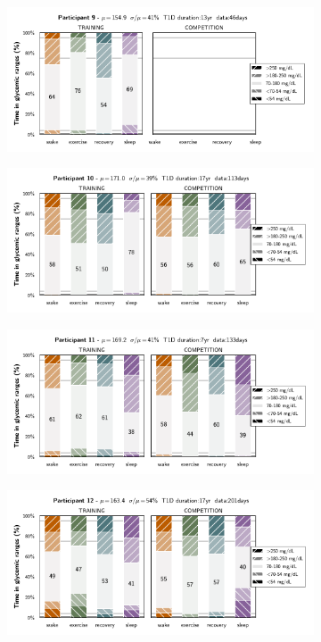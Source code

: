 \documentclass[11pt,a4paper]{article}
\begin{document}
\begin{figure}\ContinuedFloat
    \centering
    \begin{subfigure}{\textwidth}
        \centering
        \includegraphics[width=.75\textwidth]{figure/time_in_zone/time_in_glucoselevel_traincomp_9.pdf}
    \end{subfigure}\vfill
    \begin{subfigure}{\textwidth}
        \centering
        \includegraphics[width=.75\textwidth]{figure/time_in_zone/time_in_glucoselevel_traincomp_10.pdf}
    \end{subfigure}\vfill
    \begin{subfigure}{\textwidth}
        \centering
        \includegraphics[width=.75\textwidth]{figure/time_in_zone/time_in_glucoselevel_traincomp_11.pdf}
    \end{subfigure}\vfill
    \begin{subfigure}{\textwidth}
        \centering
        \includegraphics[width=.75\textwidth]{figure/time_in_zone/time_in_glucoselevel_traincomp_12.pdf}
    \end{subfigure}\vfill
\end{figure}
\end{document}
